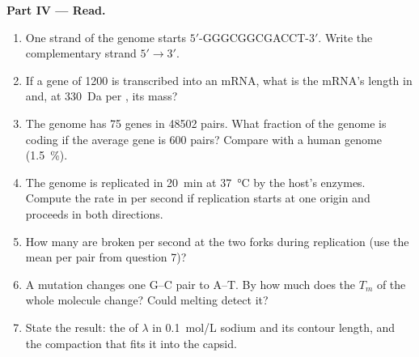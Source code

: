 \begin{problem}
\medskip
\noindent\textbf{Part IV --- Read.}
\begin{enumerate}[resume]
  \item One strand of the genome starts $5'$-GGGCGGCGACCT-$3'$. Write the
        complementary strand $5' \to 3'$.
  \item If a gene of \num{1200}  is transcribed into an mRNA,
        what is the mRNA's length in  and, at \qty{330}{Da}
        per , its mass?
  \item The genome has \qty{75}{} genes in \num{48502} pairs. What
        fraction of the genome is coding if the average gene is
        \num{600} pairs? Compare with a human genome (\qty{1.5}{\%}).
  \item The genome is replicated in \qty{20}{min} at \qty{37}{\celsius}
        by the host's enzymes. Compute the rate in  per second
        if replication starts at one origin and proceeds in both
        directions.
  \item How many  are broken per second at the two
        forks during replication (use the mean per pair from
        question 7)?
  \item A mutation changes one G--C pair to A--T. By how much does the
        $T_m$ of the whole molecule change? Could melting detect it?
  \item State the result: the  of $\lambda$  in
        \qty{0.1}{mol/L} sodium and its contour length, and the
        compaction that fits it into the capsid.
\end{enumerate}
\end{problem}

